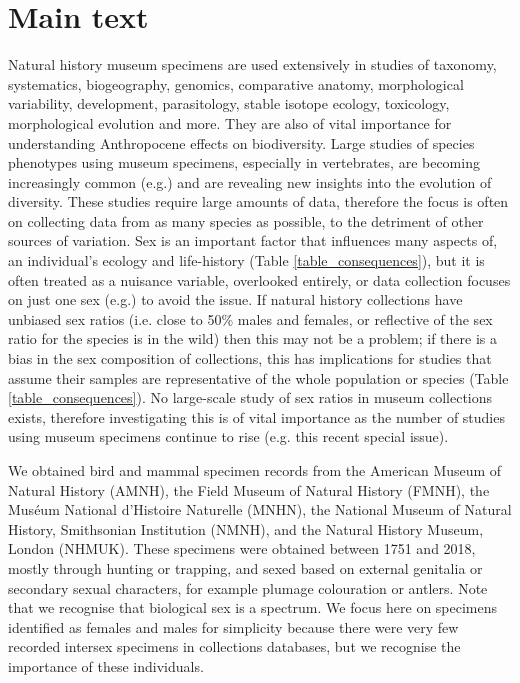 \documentclass[a4paper, 12pt]{article}
\begin{document}
\section{Main text}\label{main}
Natural history museum specimens are used extensively in studies of taxonomy, systematics, biogeography, genomics, comparative anatomy, morphological variability, development, parasitology, stable isotope ecology, toxicology, morphological evolution and more\cite{lister2011natural,pyke2010biological,mclean2015natural}. 
They are also of vital importance for understanding Anthropocene effects on biodiversity\cite{meineke2018biological}. 
Large studies of species phenotypes using museum specimens, especially in vertebrates, are becoming increasingly common (e.g.\cite{cooney2017mega,felice2018developmental}) and are revealing new insights into the evolution of diversity. 
These studies require large amounts of data, therefore the focus is often on collecting data from as many species as possible, to the detriment of other sources of variation. 
Sex is an important factor that influences many aspects of, an individual's ecology and life-history (Table \ref{table_consequences}), but it is often treated as a nuisance variable, overlooked entirely, or data collection focuses on just one sex (e.g.\cite{cooper2009factors}) to avoid the issue. 
If natural history collections have unbiased sex ratios (i.e. close to 50\% males and females, or reflective of the sex ratio for the species is in the wild\cite{karlin1986theoretical}) then this may not be a problem; if there is a bias in the sex composition of collections, this has implications for studies that assume their samples are representative of the whole population or species (Table \ref{table_consequences}). 
No large-scale study of sex ratios in museum collections exists, therefore investigating this is of vital importance as the number of studies using museum specimens continue to rise (e.g. this recent special issue\cite{meineke2018biological}).

\newpage
\begin{landscape}
  
\end{landscape}

\newpage
We obtained bird and mammal specimen records from the American Museum of Natural History (AMNH), the Field Museum of Natural History (FMNH), the Mus\'{e}um National d'Histoire Naturelle (MNHN), the National Museum of Natural History, Smithsonian Institution (NMNH), and the Natural History Museum, London (NHMUK). 
These specimens were obtained between 1751 and 2018, mostly through hunting or trapping, and sexed based on external genitalia or secondary sexual characters, for example plumage colouration or antlers. 
Note that we recognise that biological sex is a spectrum\cite{sciam2017}. 
We focus here on specimens identified as females and males for simplicity because there were very few recorded intersex specimens in collections databases, but we recognise the importance of these individuals.
\end{document}
